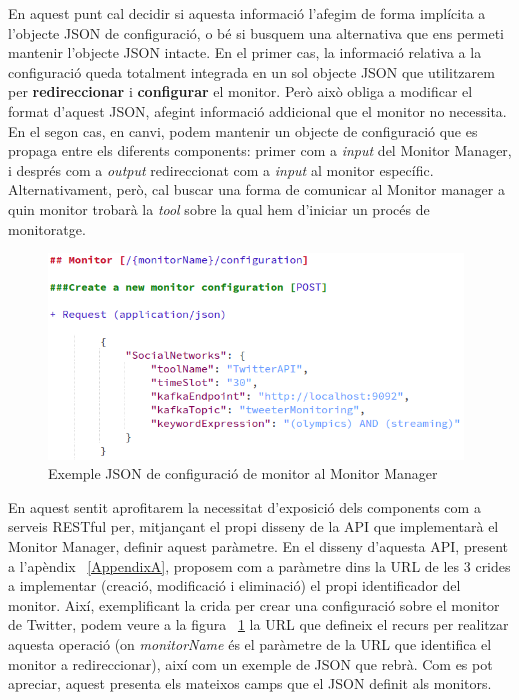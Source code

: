En aquest punt cal decidir si aquesta informació l'afegim de forma implícita a l'objecte JSON de configuració, o bé si busquem una alternativa que ens permeti mantenir l'objecte JSON intacte. En el primer cas, la informació relativa a la configuració queda totalment integrada en un sol objecte JSON que utilitzarem per \textbf{redireccionar} i \textbf{configurar} el monitor. Però això obliga a modificar el format d'aquest JSON, afegint informació addicional que el monitor no necessita. En el segon cas, en canvi, podem mantenir un objecte de configuració que es propaga entre els diferents components: primer com a \textit{input} del Monitor Manager, i després com a \textit{output} redireccionat com a \textit{input} al monitor específic. Alternativament, però, cal buscar una forma de comunicar al Monitor manager a quin monitor trobarà la \textit{tool} sobre la qual hem d'iniciar un procés de monitoratge.\\

\begin{figure}[!h]
\centering
\includegraphics[width=11cm]{Figures/Figure15}
\decoRule
\caption[Exemple JSON de configuració de monitor al Monitor Manager]{Exemple JSON de configuració de monitor al Monitor Manager}
\label{fig:Figura15}
\end{figure}

En aquest sentit aprofitarem la necessitat d'exposició dels components com a serveis RESTful per, mitjançant el propi disseny de la API que implementarà el Monitor Manager, definir aquest paràmetre. En el  disseny d'aquesta API, present a l'apèndix ~\ref{AppendixA}, proposem com a paràmetre dins la URL de les 3 crides a implementar (creació, modificació i eliminació) el propi identificador del monitor. Així, exemplificant la crida per crear una configuració sobre el monitor de Twitter, podem veure a la figura ~\ref{fig:Figura15} la URL que defineix el recurs per realitzar aquesta operació (on \textit{monitorName} és el paràmetre de la URL que identifica el monitor a redireccionar), així com un exemple de JSON que rebrà. Com es pot apreciar, aquest presenta els mateixos camps que el JSON definit als monitors.\\

